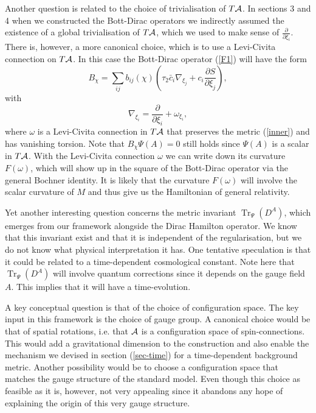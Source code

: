 \documentclass[letterpaper,11pt]{article}
\def\oo{\omega}
\def\ca{{\cal A}}
\newcommand{\pa}{\partial}
\newcommand{\Tr}{\operatorname{Tr}}
\begin{document}
Another question is related to the choice of trivialisation of $T\ca$. In sections 3 and 4 when we constructed the Bott-Dirac operators we indirectly assumed the existence of a global trivialisation of $T\ca$, which we used to make sense of $\frac{\pa}{\pa\xi_i}$. There is, however, a more canonical choice, which is to use a Levi-Civita connection on $T\ca$.
In this case the Bott-Dirac operator (\ref{F1}) will have the form
$$
B_\chi  =\sum_{ij} b_{ij}(\chi) \left(\tau_2\bar{c}_{i} \nabla_{\xi_j} + {c}_{i} \frac{\pa S}{\pa\xi_j} \right) ,
$$
with
$$
\nabla_{\xi_i}= \frac{\pa}{\pa\xi_i}+ \oo_{\xi_i},
$$
where $\oo$ is a Levi-Civita connection in $T\ca$ that preserves the metric (\ref{inner}) and has vanishing torsion. Note that $B_\chi \Psi (A)=0$ still holds since $\Psi{(A)}$ is a scalar in $T\ca$. 
With the Levi-Civita connection $\oo$ we can write down its curvature 
$
F(\oo)
$, which will show up in the square of the Bott-Dirac operator via the general Bochner identity. It is likely that the curvature $F(\oo)$ will involve the scalar curvature of $M$ and thus give us the Hamiltonian of general relativity. 






Yet another interesting question concerns the metric invariant $\Tr_\Psi (D^A)$, which emerges from our framework alongside the Dirac Hamilton operator. We know that this invariant exist and that it is independent of the regularisation, but we do not know what physical interpretation it has. One tentative speculation is that it could be related to a time-dependent cosmological constant.  Note here that $\Tr_\Psi (D^A)$ will involve quantum corrections since it depends on the gauge field $A$. This implies that it will have a time-evolution.


A key conceptual question is that of the choice of configuration space. The key input in this framework is the choice of gauge group. A canonical choice would be that of spatial rotations, i.e. that $\ca$ is a configuration space of spin-connections. This would add a gravitational dimension to the construction and also enable the mechanism we devised in section (\ref{sec-time}) for a time-dependent background metric. Another possibility would be to choose a configuration space that matches the gauge structure of the standard model. Even though this choice as feasible as it is, however, not very appealing since it abandons any hope of explaining the origin of this very gauge structure. 
\end{document}
